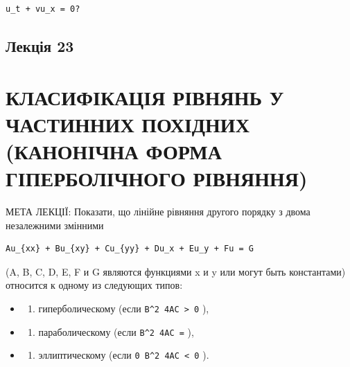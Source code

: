 \documentclass[
  ukrainian,
]{article}
\providecommand{\tightlist}{%
  \setlength{\itemsep}{0pt}\setlength{\parskip}{0pt}}
\begin{document}
\begin{verbatim}
u_t + vu_x = 0?
\end{verbatim}

\subsection{Лекція 23}\label{ux43bux435ux43aux446ux456ux44f-23}

\section{КЛАСИФІКАЦІЯ РІВНЯНЬ У ЧАСТИННИХ ПОХІДНИХ (КАНОНІЧНА ФОРМА
ГІПЕРБОЛІЧНОГО
РІВНЯННЯ)}\label{ux43aux43bux430ux441ux438ux444ux456ux43aux430ux446ux456ux44f-ux440ux456ux432ux43dux44fux43dux44c-ux443-ux447ux430ux441ux442ux438ux43dux43dux438ux445-ux43fux43eux445ux456ux434ux43dux438ux445-ux43aux430ux43dux43eux43dux456ux447ux43dux430-ux444ux43eux440ux43cux430-ux433ux456ux43fux435ux440ux431ux43eux43bux456ux447ux43dux43eux433ux43e-ux440ux456ux432ux43dux44fux43dux43dux44f}

МЕТА ЛЕКЦІЇ: Показати, що лінійне рівняння другого порядку з двома
незалежними змінними

\begin{verbatim}
Au_{xx} + Bu_{xy} + Cu_{yy} + Du_x + Eu_y + Fu = G
\end{verbatim}

(A, B, C, D, E, F и G являются функциями x и y или могут быть
константами) относится к одному из следующих типов:

\begin{itemize}
\tightlist
\item
  \begin{enumerate}
  \def\labelenumi{\arabic{enumi})}
  \tightlist
  \item
    гиперболическому (если \texttt{B\^{}2\ 4AC\ \textgreater{}\ 0} ),
  \end{enumerate}
\item
  \begin{enumerate}
  \def\labelenumi{\arabic{enumi})}
  \setcounter{enumi}{1}
  \tightlist
  \item
    параболическому (если \texttt{B\^{}2\ 4AC\ =} ),
  \end{enumerate}
\item
  \begin{enumerate}
  \def\labelenumi{\arabic{enumi})}
  \setcounter{enumi}{2}
  \tightlist
  \item
    эллиптическому (если \texttt{0\ B\^{}2\ 4AC\ \textless{}\ 0} ).
  \end{enumerate}
\end{itemize}
\end{document}
